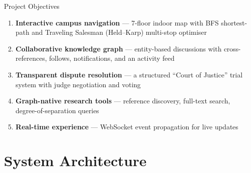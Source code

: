 \documentclass[aspectratio=169,11pt]{beamer}
\begin{document}
\begin{frame}{Project Objectives}
  \begin{enumerate}
    \item \textbf{Interactive campus navigation} ---
          7-floor indoor map with BFS shortest-path and
          Traveling Salesman (Held--Karp) multi-stop optimiser
    \item \textbf{Collaborative knowledge graph} ---
          entity-based discussions with cross-references,
          follows, notifications, and an activity feed
    \item \textbf{Transparent dispute resolution} ---
          a structured ``Court of Justice'' trial system
          with judge negotiation and voting
    \item \textbf{Graph-native research tools} ---
          reference discovery, full-text search,
          degree-of-separation queries
    \item \textbf{Real-time experience} ---
          WebSocket event propagation for live updates
  \end{enumerate}
\end{frame}

\section{System Architecture}
\end{document}
